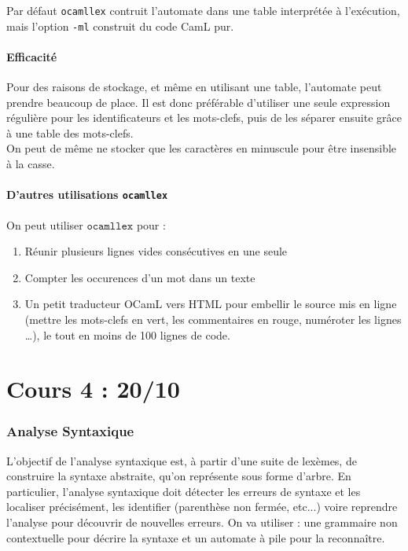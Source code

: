\documentclass{cours}
\begin{document}
Par défaut \texttt{ocamllex} contruit l'automate dans une table interprétée à l'exécution, mais l'option \texttt{-ml} construit du code CamL pur.

\subsection{Efficacité}
Pour des raisons de stockage, et même en utilisant une table, l'automate peut prendre beaucoup de place. Il est donc préférable d'utiliser une seule expression régulière pour les identificateurs et les mots-clefs, puis de les séparer ensuite grâce à une table des mots-clefs.\\
On peut de même ne stocker que les caractères en minuscule pour être insensible à la casse.

\subsection{D'autres utilisations \texttt{ocamllex}}
On peut utiliser $\texttt{ocamllex}$ pour :
\begin{enumerate}
    \item Réunir plusieurs lignes vides consécutives en une seule
    \item Compter les occurences d'un mot dans un texte
    \item Un petit traducteur OCamL vers HTML pour embellir le source mis en ligne (mettre les mots-clefs en vert, les commentaires en rouge, numéroter les lignes \dots), le tout en moins de 100 lignes de code.
\end{enumerate}

\newpage
\part[Analyse Syntaxique]{Cours 4 : 20/10}\label{part:AnalyseSyntaxique}
\localtableofcontents
\section{Analyse Syntaxique}
L'objectif de l'analyse syntaxique est, à partir d'une suite de lexèmes, de construire la syntaxe abstraite, qu'on représente sous forme d'arbre. En particulier, l'analyse syntaxique doit détecter les erreurs de syntaxe et les localiser précisément, les identifier (parenthèse non fermée, etc...) voire reprendre l'analyse pour découvrir de nouvelles erreurs. On va utiliser : une grammaire non contextuelle pour décrire la syntaxe et un automate à pile pour la reconnaître.
\end{document}
